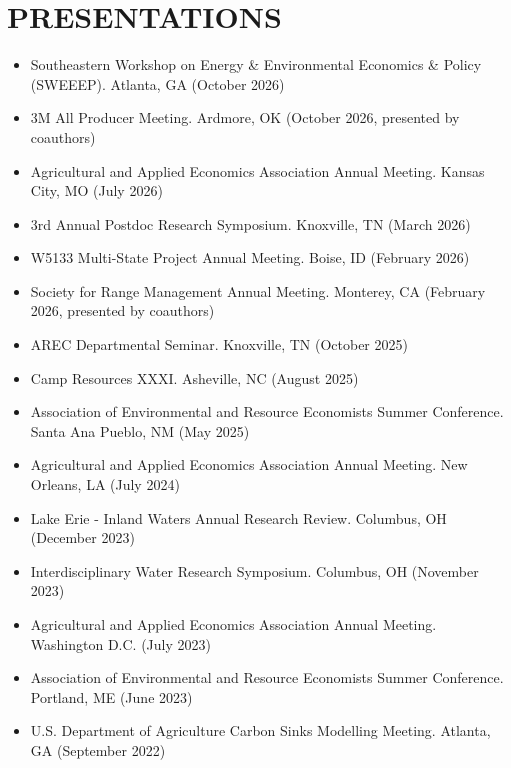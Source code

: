 \documentclass[letterpaper,11pt]{article}
\begin{document}
\section{PRESENTATIONS}
\begin{itemize}[leftmargin=1em, itemsep=0pt]
    \item[\small\textbullet] Southeastern Workshop on Energy \& Environmental Economics \& Policy (SWEEEP). Atlanta, GA (October 2026)
    \item[\small\textbullet] 3M All Producer Meeting. Ardmore, OK (October 2026, presented by coauthors)
    \item[\small\textbullet] Agricultural and Applied Economics Association Annual Meeting. Kansas City, MO (July 2026)
    \item[\small\textbullet] 3rd Annual Postdoc Research Symposium. Knoxville, TN (March 2026)
    \item[\small\textbullet] W5133 Multi-State Project Annual Meeting. Boise, ID (February 2026)
    \item[\small\textbullet] Society for Range Management Annual Meeting. Monterey, CA (February 2026, presented by coauthors)
    \item[\small\textbullet] AREC Departmental Seminar. Knoxville, TN (October 2025)
    \item[\small\textbullet] Camp Resources XXXI. Asheville, NC (August 2025)
    \item[\small\textbullet] Association of Environmental and Resource Economists Summer Conference. Santa Ana Pueblo, NM (May 2025)
    \item[\small\textbullet] Agricultural and Applied Economics Association Annual Meeting. New Orleans, LA (July 2024)
    \item[\small\textbullet] Lake Erie - Inland Waters Annual Research Review. Columbus, OH (December 2023)
    \item[\small\textbullet] Interdisciplinary Water Research Symposium. Columbus, OH (November 2023)
    \item[\small\textbullet] Agricultural and Applied Economics Association Annual Meeting. Washington D.C. (July 2023)
    \item[\small\textbullet] Association of Environmental and Resource Economists Summer Conference. Portland, ME (June 2023)
    \item[\small\textbullet] U.S. Department of Agriculture Carbon Sinks Modelling Meeting. Atlanta, GA (September 2022)
\end{itemize}
\end{document}
